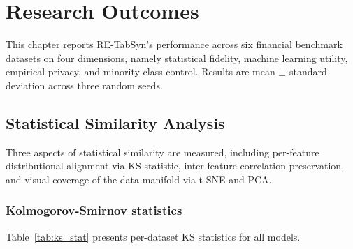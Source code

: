 \chapter{Research Outcomes}

This chapter reports RE-TabSyn's performance across six financial benchmark datasets on four dimensions, namely statistical fidelity, machine learning utility, empirical privacy, and minority class control. Results are mean $\pm$ standard deviation across three random seeds.

\section{Statistical Similarity Analysis}

Three aspects of statistical similarity are measured, including per-feature distributional alignment via KS statistic, inter-feature correlation preservation, and visual coverage of the data manifold via t-SNE and PCA.

\subsection{Kolmogorov-Smirnov statistics}

Table~\ref{tab:ks_stat} presents per-dataset KS statistics for all models.

\renewcommand{\arraystretch}{1.2}


